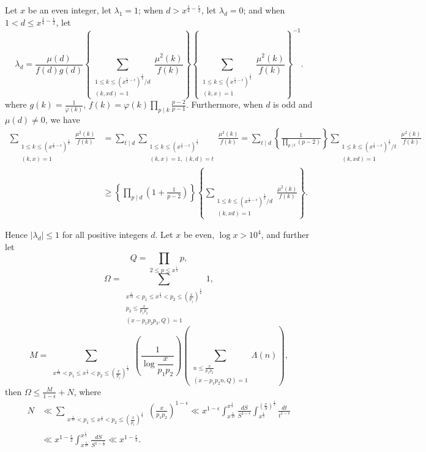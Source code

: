 Let $x$ be an even integer, let $\lambda_1=1$; when $d>x^{\frac14-\frac{\epsilon}{2}}$, let $\lambda_d=0$; and when $1<d\leqslant x^{\frac14-\frac{\epsilon}{2}}$, let
\[
\lambda_d=\frac{\mu(d)}{f(d)g(d)}
\left\{
\sum_{\substack{1\leqslant k\leqslant(x^{\frac12-\epsilon})^{\frac12}/d\\(k,xd)=1}}
\frac{\mu^2(k)}{f(k)}
\right\}
\left\{
\sum_{\substack{1\leqslant k\leqslant(x^{\frac12-\epsilon})^{\frac12}\\(k,x)=1}}
\frac{\mu^2(k)}{f(k)}
\right\}^{-1}.
\]
where $\displaystyle g(k)=\frac{1}{\varphi(k)}$, $\displaystyle f(k)=\varphi(k)\prod_{p\mid k}\frac{p-2}{p-1}$. Furthermore, when $d$ is odd and $\mu(d)\neq0$, we have
\begin{align*}
\sum_{\substack{1\leqslant k\leqslant(x^{\frac12-\epsilon})^{\frac12}\\(k,x)=1}}
\frac{\mu^2(k)}{f(k)}
&=\sum_{t\mid d}\sum_{\substack{1\leqslant k\leqslant(x^{\frac12-\epsilon})^{\frac12}\\(k,x)=1,\,(k,d)=t}}
\frac{\mu^2(k)}{f(k)}
=\sum_{t\mid d}\left\{\frac{1}{\prod_{p\mid t}(p-2)}\right\}
\sum_{\substack{1\leqslant k\leqslant(x^{\frac12-\epsilon})^{\frac12}/t\\(k,xd)=1}}
\frac{\mu^2(k)}{f(k)}\\
&\geqslant\left\{\prod_{p\mid d}\left(1+\frac{1}{p-2}\right)\right\}
\left\{
\sum_{\substack{1\leqslant k\leqslant(x^{\frac12-\epsilon})^{\frac12}/d\\(k,xd)=1}}
\frac{\mu^2(k)}{f(k)}
\right\}.
\end{align*}

Hence $|\lambda_d|\leqslant1$ for all positive integers $d$. Let $x$ be even, $\log x>10^4$, and further let
\[
Q=\prod_{2\leqslant p\leqslant x^{\frac14}}p,
\]
\[
\Omega=\sum_{\substack{x^{\frac1{10}}<p_1\leqslant x^{\frac13}<p_2\leqslant(\frac{x}{p_1})^{\frac12}\\p_3\leqslant\frac{x}{p_1p_2}\\(x-p_1p_2p_3,Q)=1}}1,
\]
\[
M=\sum_{\substack{x^{\frac1{10}}<p_1\leqslant x^{\frac13}<p_2\leqslant(\frac{x}{p_1})^{\frac12}}}
\left(\frac{1}{\log\dfrac{x}{p_1p_2}}\right)
\left(\sum_{\substack{n\leqslant\frac{x}{p_1p_2}\\(x-p_1p_2n,Q)=1}}\Lambda(n)\right),
\]
then $\displaystyle \Omega\leqslant\frac{M}{1-\epsilon}+N$, where
\begin{align*}
N&\ll\sum_{\substack{x^{\frac1{10}}<p_1\leqslant x^{\frac13}<p_2\leqslant(\frac{x}{p_1})^{\frac12}}}
\left(\frac{x}{p_1p_2}\right)^{1-\epsilon}
\ll x^{1-\epsilon}\int_{x^{\frac1{10}}}^{x^{\frac13}}\frac{dS}{S^{1-\epsilon}}
\int_{x^{\frac13}}^{(\frac{x}{S})^{\frac12}}\frac{dt}{t^{1-\epsilon}}\\
&\ll x^{1-\frac{\epsilon}{2}}\int_{x^{\frac1{10}}}^{x^{\frac13}}\frac{dS}{S^{1-\frac{\epsilon}{2}}}
\ll x^{1-\frac{\epsilon}{3}}.
\end{align*}

